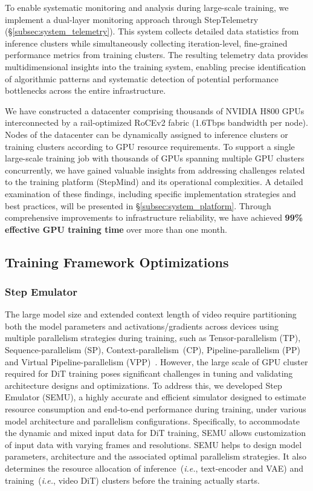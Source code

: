 To enable systematic monitoring and analysis during large-scale training, we implement a dual-layer monitoring approach through StepTelemetry (\S\ref{subsec:system_telemetry}). This system collects detailed data statistics from inference clusters while simultaneously collecting iteration-level, fine-grained performance metrics from training clusters. The resulting telemetry data provides multidimensional insights into the training system, enabling precise identification of algorithmic patterns and systematic detection of potential performance bottlenecks across the entire infrastructure.


We have constructed a datacenter comprising thousands of NVIDIA H800 GPUs interconnected by a rail-optimized RoCEv2 fabric (1.6Tbps bandwidth per node). Nodes of the datacenter can be dynamically assigned to inference clusters or training clusters according to GPU resource requirements.
To support a single large-scale training job with thousands of GPUs spanning multiple GPU clusters concurrently, we have gained valuable insights from addressing challenges related to the training platform (StepMind) and its operational complexities. A detailed examination of these findings, including specific implementation strategies and best practices, will be presented in \S\ref{subsec:system_platform}. Through comprehensive improvements to infrastructure reliability, we have achieved \textbf{99\% effective GPU training time} over more than one month.



\subsection{Training Framework Optimizations}
\label{subsec:system_framework}

\subsubsection{Step Emulator}
\label{subsubsec:system_semu}
The large model size and extended context length of video require partitioning both the model parameters and activations/gradients across devices using multiple parallelism strategies during training, such as Tensor-parallelism (TP), Sequence-parallelism (SP), Context-parallelism~(CP), Pipeline-parallelism (PP) and Virtual Pipeline-parallelism (VPP)~\cite{pp2021,tpsp2023, scp, hcp}. 
However, the large scale of GPU cluster required for DiT training poses significant challenges in tuning and validating architecture designs and optimizations. To address this, we developed Step Emulator (SEMU), a highly accurate and efficient simulator designed to estimate resource consumption and end-to-end performance during training, under various model architecture and parallelism configurations. Specifically, to accommodate the dynamic and mixed input data for DiT training, SEMU allows customization of input data with varying frames and resolutions. SEMU helps to design model parameters,  architecture and the associated optimal parallelism strategies. It also determines the resource allocation of inference~(\textit{i.e.}, text-encoder and VAE) and training~(\textit{i.e.}, video DiT) clusters before the training actually starts. 


